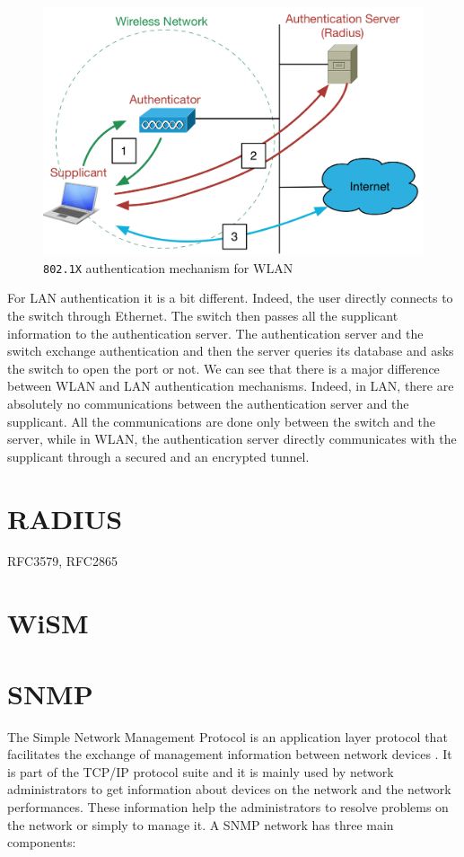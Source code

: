 \begin{figure}[H]
	\includegraphics[width=.7\linewidth]{Pictures/Chapter2/802.png}
	\caption{\texttt{802.1X} authentication mechanism for WLAN}
\end{figure}

For LAN authentication it is a bit different. Indeed, the user directly connects to the switch through Ethernet. The switch then passes all the supplicant information to the authentication server. The authentication server and the switch exchange authentication and then the server queries its database and asks the switch to open the port or not.
We can see that there is a major difference between WLAN and LAN authentication mechanisms. Indeed, in LAN, there are absolutely no communications between the authentication server and the supplicant. All the communications are done only between the switch and the server, while in WLAN, the authentication server directly communicates with the supplicant through a secured and an encrypted tunnel. 



\section{RADIUS}
RFC3579, RFC2865

\section{WiSM}


\section{SNMP}

The Simple Network Management Protocol is an application layer protocol that facilitates the exchange of management information between network devices \cite{snmp}. It is part of the TCP/IP protocol suite and it is mainly used by network administrators to get information about devices on the network and the network performances. These information help the administrators to resolve problems on the network or simply to manage it.
A SNMP network has three main components:

